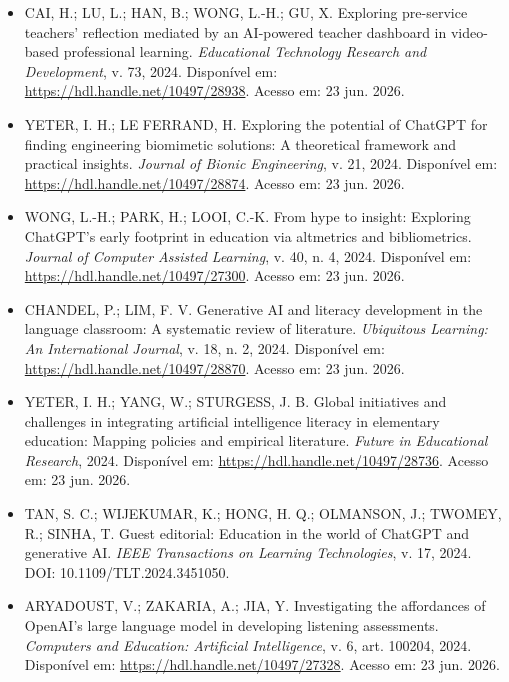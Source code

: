 \documentclass[english]{textolivre}
\begin{document}
\begin{itemize}
\item[] CAI, H.; LU, L.; HAN, B.; WONG, L.-H.; GU, X. Exploring pre-service teachers’ reflection mediated by an AI-powered teacher dashboard in video-based professional learning. \textit{Educational Technology Research and Development}, v. 73, 2024. Disponível em: \url{https://hdl.handle.net/10497/28938}. Acesso em: 23 jun. 2026.

\item[] YETER, I. H.; LE FERRAND, H. Exploring the potential of ChatGPT for finding engineering biomimetic solutions: A theoretical framework and practical insights. \textit{Journal of Bionic Engineering}, v. 21, 2024. Disponível em: \url{https://hdl.handle.net/10497/28874}. Acesso em: 23 jun. 2026.

\item[] WONG, L.-H.; PARK, H.; LOOI, C.-K. From hype to insight: Exploring ChatGPT’s early footprint in education via altmetrics and bibliometrics. \textit{Journal of Computer Assisted Learning}, v. 40, n. 4, 2024. Disponível em: \url{https://hdl.handle.net/10497/27300}. Acesso em: 23 jun. 2026.

\item[] CHANDEL, P.; LIM, F. V. Generative AI and literacy development in the language classroom: A systematic review of literature. \textit{Ubiquitous Learning: An International Journal}, v. 18, n. 2, 2024. Disponível em: \url{https://hdl.handle.net/10497/28870}. Acesso em: 23 jun. 2026.

\item[] YETER, I. H.; YANG, W.; STURGESS, J. B. Global initiatives and challenges in integrating artificial intelligence literacy in elementary education: Mapping policies and empirical literature. \textit{Future in Educational Research}, 2024. Disponível em: \url{https://hdl.handle.net/10497/28736}. Acesso em: 23 jun. 2026.

\item[] TAN, S. C.; WIJEKUMAR, K.; HONG, H. Q.; OLMANSON, J.; TWOMEY, R.; SINHA, T. Guest editorial: Education in the world of ChatGPT and generative AI. \textit{IEEE Transactions on Learning Technologies}, v. 17, 2024. DOI: 10.1109/TLT.2024.3451050.

\item[] ARYADOUST, V.; ZAKARIA, A.; JIA, Y. Investigating the affordances of OpenAI’s large language model in developing listening assessments. \textit{Computers and Education: Artificial Intelligence}, v. 6, art. 100204, 2024. Disponível em: \url{https://hdl.handle.net/10497/27328}. Acesso em: 23 jun. 2026.


\end{itemize}
\end{document}
